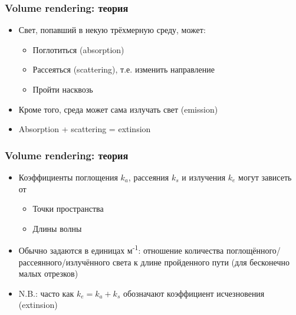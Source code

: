 \documentclass{beamer}
\begin{document}
\begin{frame}[fragile]
\frametitle{Volume rendering: теория}
\begin{itemize}
\item Свет, попавший в некую трёхмерную среду, может:
\pause
\begin{itemize}
\item Поглотиться (absorption)
\pause
\item Рассеяться (scattering), т.е. изменить направление
\pause
\item Пройти насквозь
\end{itemize}
\pause
\item Кроме того, среда может сама излучать свет (emission)
\pause
\item Absorption + scattering = extinsion
\end{itemize}
\end{frame}

\begin{frame}[fragile]
\frametitle{Volume rendering: теория}
\begin{itemize}
\item Коэффициенты поглощения \begin{math}k_a\end{math}, рассеяния \begin{math}k_s\end{math} и излучения \begin{math}k_e\end{math} могут зависеть от
\pause
\begin{itemize}
\item Точки пространства
\pause
\item Длины волны
\end{itemize}
\pause
\item Обычно задаются в единицах м\textsuperscript{-1}: отношение количества поглощённого/рассеянного/излучённого света к длине пройденного пути (для бесконечно малых отрезков)
\pause
\item N.B.: часто как \begin{math}k_e = k_a + k_s\end{math} обозначают коэффициент исчезновения (extinsion)
\end{itemize}
\end{frame}
\end{document}
